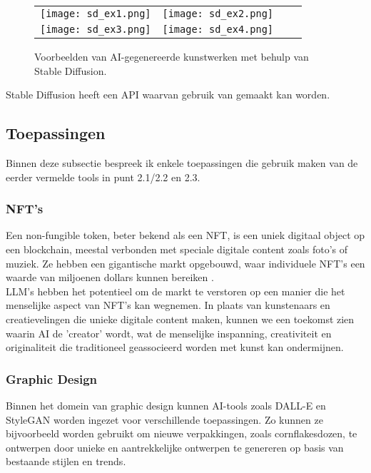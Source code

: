 \begin{figure}[h!]
    \centering
    \begin{tabular}{llll}
        \texttt{[image: sd\_ex1.png]} &
        \texttt{[image: sd\_ex2.png]} \\
        \texttt{[image: sd\_ex3.png]} &
        \texttt{[image: sd\_ex4.png]}
    \end{tabular}
    \caption{Voorbeelden van AI-gegenereerde kunstwerken met behulp van Stable Diffusion.}
    \label{fig:examples}
\end{figure}

Stable Diffusion heeft een API waarvan gebruik van gemaakt kan worden. \\

\pagebreak

\subsection{Toepassingen}
Binnen deze subsectie bespreek ik enkele toepassingen die gebruik maken van de eerder vermelde tools in punt 2.1/2.2 en 2.3.

\subsubsection{NFT's}
Een non-fungible token, beter bekend als een NFT, is een uniek digitaal object op een blockchain, meestal verbonden met speciale digitale content zoals foto's of muziek. Ze hebben een gigantische markt opgebouwd, waar individuele NFT's een waarde van miljoenen dollars kunnen bereiken \autocite{nft_whatisit}. \\

LLM's hebben het potentieel om de markt te verstoren op een manier die het menselijke aspect van NFT's kan wegnemen. In plaats van kunstenaars en creatievelingen die unieke digitale content maken, kunnen we een toekomst zien waarin AI de 'creator' wordt, wat de menselijke inspanning, creativiteit en originaliteit die traditioneel geassocieerd worden met kunst kan ondermijnen. 

\subsubsection{Graphic Design}
Binnen het domein van graphic design kunnen AI-tools zoals DALL-E en StyleGAN worden ingezet voor verschillende toepassingen. Zo kunnen ze bijvoorbeeld worden gebruikt om nieuwe verpakkingen, zoals cornflakesdozen, te ontwerpen door unieke en aantrekkelijke ontwerpen te genereren op basis van bestaande stijlen en trends.  \\

